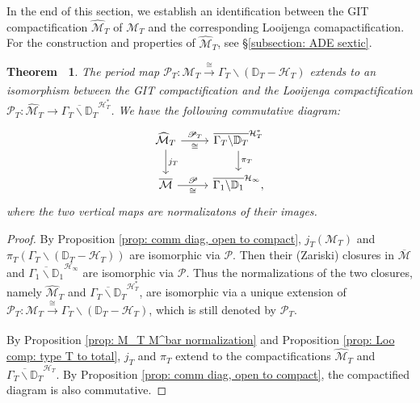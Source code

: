 \documentclass[12pt,reqno,a4paper]{amsart}
\newtheorem{thm}{Theorem~}[section]
\theoremstyle{remark}
\theoremstyle{definition}
\begin{document}
In the end of this section, we establish an identification between the GIT compactification $\widehat{\mathcal{M}}_T$ of $\mathcal{M}_T$ and the corresponding Looijenga comapactification.
For the construction and properties of $\widehat{\mathcal{M}}_T$, see \S \ref{subsection: ADE sextic}.
\begin{thm}
\label{thm: comm diag, compact to compact}
    The period map $\mathscr{P}_T\colon\mathcal{M}_T\xrightarrow[]{\cong}\Gamma_T\backslash(\mathbb{D}_T-\mathcal{H}_T)$ extends to an isomorphism between the GIT compactification and the Looijenga compactification $\mathscr{P}_T\colon \widehat{\mathcal{M}}_T\to\overline{\Gamma_T\backslash\mathbb{D}_T}^{\mathcal{H}_T^*}$.
    We have the following commutative diagram:
    \begin{equation*}
    \begin{tikzcd}
      \widehat{\mathcal{M}}_T \arrow[r,"\mathscr{P}_T","\cong"'] \arrow[d,"j_T"] & \overline{\Gamma_T\backslash\mathbb{D}_T}^{\mathcal{H}_T^*} \arrow[d,"\pi_T"] \\
      \overline{\mathcal{M}} \arrow[r,"\mathscr{P}","\cong"'] & \overline{\Gamma_1\backslash\mathbb{D}_1}^{\mathcal{H}_\infty},
    \end{tikzcd}
    \end{equation*}
    where the two vertical maps are normalizatons of their images.
\end{thm}
\begin{proof}
    By Proposition \ref{prop: comm diag, open to compact}, $j_T(\mathcal{M}_T)$ and $\pi_T(\Gamma_T\backslash(\mathbb{D}_T-\mathcal{H}_T))$ are isomorphic via $\mathscr{P}$.
    Then their (Zariski) closures in $\overline{\mathcal{M}}$ and $\overline{\Gamma_1\backslash\mathbb{D}_1}^{\mathcal{H}_\infty}$ are isomorphic via $\mathscr{P}$.
    Thus the normalizations of the two closures, namely $\widehat{\mathcal{M}}_T$ and $\overline{\Gamma_T\backslash\mathbb{D}_T}^{\mathcal{H}_T^*}$, are isomorphic via a unique extension of $\mathscr{P}_T\colon\mathcal{M}_T\xrightarrow[]{\cong}\Gamma_T\backslash(\mathbb{D}_T-\mathcal{H}_T)$, which is still denoted by $\mathscr{P}_T$.
    
    By Proposition \ref{prop: M_T M^bar normalization} and Proposition \ref{prop: Loo comp: type T to total}, $j_T$ and $\pi_T$ extend to the compactifications $\widehat{\mathcal{M}}_T$ and $\overline{\Gamma_T\backslash\mathbb{D}_T}^{\mathcal{H}_T}$.
    By Proposition \ref{prop: comm diag, open to compact}, the compactified diagram is also commutative.
\end{proof}
 
\end{document}
